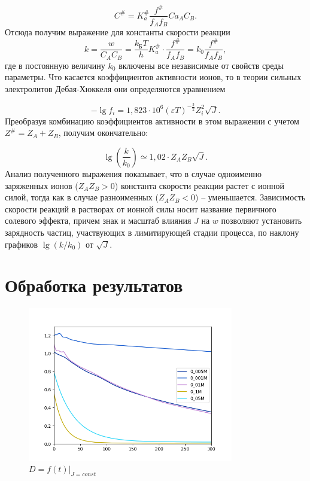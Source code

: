 \documentclass[a4paper, 12pt]{article}
\begin{document}
\[C^\#=K_a^\#\frac{f^\#}{f_Af_B}Ca_AC_B.\]
Отсюда получим выражение для константы скорости реакции
\[k=\frac{w}{C_AC_B}=\frac{k_\text{Б}T}{h}K_a^\#\cdot\frac{f^\#}{f_Af_B}=k_0\frac{f^\#}{f_Af_B},\]
где в постоянную величину $k_0$ включены все независимые от свойств среды параметры.
Что касается коэффициентов активности ионов, то в теории сильных электролитов
Дебая-Хюккеля они определяются уравнением

\[-\lg{f_i}=1,823\cdot10^6(\varepsilon T)^{-\frac{3}{2}}Z_i^2\sqrt{J}.\]
Преобразуя комбинацию коэффициентов активности в этом выражении с учетом $Z^\#=Z_A+Z_B$, получим окончательно:

\[\lg{\left(\frac{k}{k_0}\right)}\simeq 1,02\cdot Z_AZ_B\sqrt{J}.\]
Анализ полученного выражения показывает, что в случае одноименно
заряженных ионов ($Z_AZ_B > 0$) константа скорости реакции растет с ионной силой, тогда
как в случае разноименных ($Z_AZ_B < 0$) – уменьшается. Зависимость скорости реакций в
растворах от ионной силы носит название первичного солевого эффекта, причем знак и
масштаб влияния $J$ на $w$ позволяют установить зарядность частиц, участвующих в
лимитирующей стадии процесса, по наклону графиков $\lg{\left(k/k_0\right)}$ от $\sqrt{J}$.

\newpage
\section{Обработка результатов}


\begin{figure}[h]
	\centering
	\caption{$D=f(t)|_{J=const}$}
	\includegraphics[width=0.8\textwidth]{Figure_1.png}
\end{figure}
\end{document}
